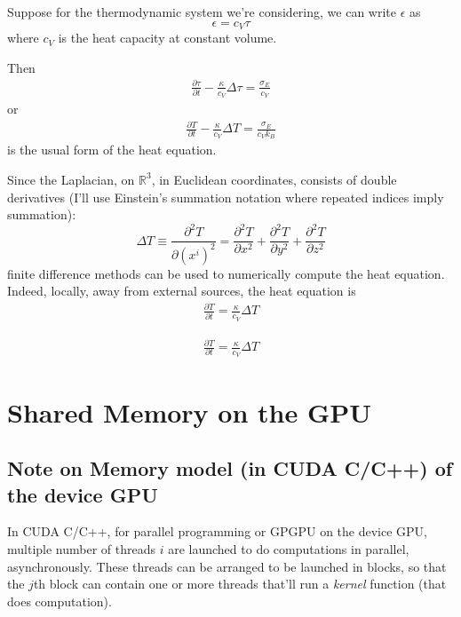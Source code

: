 \documentclass[10pt, landscape]{amsart}
\begin{document}
Suppose for the thermodynamic system we're considering, we can write $\epsilon$ as
\[
\epsilon = c_V \tau
\]
where $c_V$ is the heat capacity at constant volume.

Then
\[
\begin{gathered}
\frac{ \partial \tau }{ \partial t} - \frac{ \kappa}{c_V} \Delta \tau = \frac{ \sigma_E }{ c_V} 
\end{gathered}
\]
or
\[
\begin{gathered}
\frac{ \partial T }{ \partial t} - \frac{ \kappa}{c_V} \Delta T = \frac{ \sigma_E }{ c_V k_B} 
\end{gathered}
\]
is the usual form of the heat equation.

Since the Laplacian, on $\mathbb{R}^3$, in Euclidean coordinates, consists of double derivatives (I'll use Einstein's summation notation where repeated indices imply summation):
\[
\Delta T \equiv \frac{ \partial^2 T}{ \partial (x^i)^2 } = \frac{ \partial ^2 T}{ \partial x^2 } + \frac{ \partial ^2 T}{ \partial y^2 } + \frac{ \partial ^2 T}{ \partial z^2 }
\]
finite difference methods can be used to numerically compute the heat equation.  Indeed, locally, away from external sources, the heat equation is
\[
\begin{gathered}
\frac{ \partial T }{ \partial t} =  \frac{ \kappa}{c_V} \Delta T   
\end{gathered}
\]

\pagebreak
{\huge

\[
\begin{gathered}
\frac{ \partial T }{ \partial t} =  \frac{ \kappa}{c_V} \Delta T   
\end{gathered}
\]

}
\pagebreak

\section{Shared Memory on the GPU}

\subsection{Note on Memory model (in CUDA C/C++) of the device GPU}

In CUDA C/C++, for parallel programming or GPGPU on the device GPU, multiple number of threads $i$ are launched to do computations in parallel, asynchronously.  These threads can be arranged to be launched in blocks, so that the $j$th block can contain one or more threads that'll run a \emph{kernel} function (that does computation).
\end{document}
